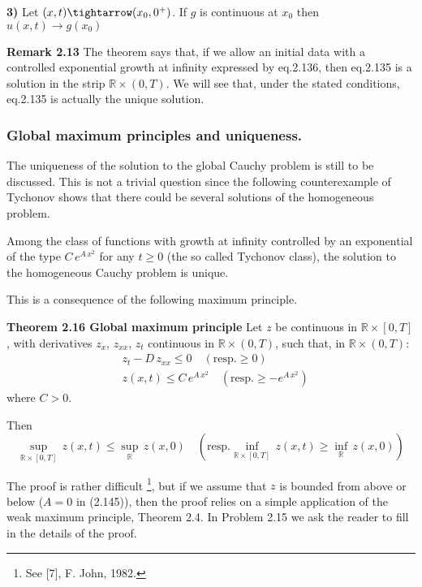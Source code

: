 \documentclass[../main.tex]{subfiles}
\begin{document}
\textbf{3)}  Let $(x,t) \tightarrow (x_0,0^+)$. If $g$ is continuous at $x_0$ then $u(x,t) \rightarrow g(x_0)$

\textbf{Remark 2.13}  The theorem says that, if we allow an initial data with a controlled exponential growth at infinity expressed by eq.2.136, then eq.2.135 is a solution in the strip $\mathbb{R} \times (0,T)$. We will see that, under the stated conditions, eq.2.135 is actually the unique solution.

\subsubsection{Global maximum principles and uniqueness.}

The uniqueness of the solution to the global Cauchy problem is still to be discussed. This is not a trivial question since the following counterexample of Tychonov shows that there could be several solutions of the homogeneous problem.

Among the class of functions with growth at infinity controlled by an exponential of the type $C \, e^{A \, x^2}$ for any $t \geqslant 0$ (the so called Tychonov class), the solution to the homogeneous Cauchy problem is unique.

This is a consequence of the following maximum principle.

\textbf{Theorem 2.16 Global maximum principle}  Let $z$ be continuous in $\mathbb{R} \times [0,T]$, with derivatives $z_x$, $z_{xx}$, $z_t$ continuous in $\mathbb{R} \times (0,T)$, such that, in $\mathbb{R} \times (0,T)$:
\begin{align}
    & z_t - D \, z_{xx} \leqslant 0 \quad (\text{resp.} \geqslant 0) \nonumber \\
    & z(x,t) \leqslant C \, e^{A \, x^2} \quad \left(\text{resp.} \geqslant -e^{A \, x^2}\right)
\end{align}
where $C > 0$.

Then
\begin{equation}
    \sup_{\mathbb{R} \times [0,T]} \, z(x,t) \leqslant \sup_{\mathbb{R}} \, z(x,0) \quad \left(\text{resp.} \inf_{\mathbb{R} \times [0,T]} \, z(x,t) \geqslant \inf_{\mathbb{R}} \, z(x,0)\right)
\end{equation}

The proof is rather difficult \footnote{See [7], F. John, 1982.}, but if we assume that $z$ is bounded from above or below ($A = 0$ in (2.145)), then the proof relies on a simple application of the weak maximum principle, Theorem 2.4. In Problem 2.15 we ask the reader to fill in the details of the proof.
\end{document}
